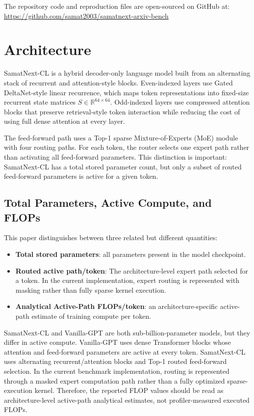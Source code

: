 \documentclass[11pt,a4paper]{article}
\begin{document}
The repository code and reproduction files are open-sourced on GitHub at: \\
\url{https://github.com/samat2003/samatnext-arxiv-bench}

\section{Architecture}
SamatNext-CL is a hybrid decoder-only language model built from an alternating stack of recurrent and attention-style blocks. Even-indexed layers use Gated DeltaNet-style linear recurrence, which maps token representations into fixed-size recurrent state matrices $S \in \mathbb{R}^{64 \times 64}$. Odd-indexed layers use compressed attention blocks that preserve retrieval-style token interaction while reducing the cost of using full dense attention at every layer.

The feed-forward path uses a Top-1 sparse Mixture-of-Experts (MoE) module with four routing paths. For each token, the router selects one expert path rather than activating all feed-forward parameters. This distinction is important: SamatNext-CL has a total stored parameter count, but only a subset of routed feed-forward parameters is active for a given token.

\subsection{Total Parameters, Active Compute, and FLOPs}
This paper distinguishes between three related but different quantities:

\begin{itemize}
\item \textbf{Total stored parameters}: all parameters present in the model checkpoint.
\item \textbf{Routed active path/token}: The architecture-level expert path selected for a token. In the current implementation, expert routing is represented with masking rather than fully sparse kernel execution.
\item \textbf{Analytical Active-Path FLOPs/token}: an architecture-specific active-path estimate of training compute per token.
\end{itemize}

SamatNext-CL and Vanilla-GPT are both sub-billion-parameter models, but they differ in active compute. Vanilla-GPT uses dense Transformer blocks whose attention and feed-forward parameters are active at every token. SamatNext-CL uses alternating recurrent/attention blocks and Top-1 routed feed-forward selection. In the current benchmark implementation, routing is represented through a masked expert computation path rather than a fully optimized sparse-execution kernel. Therefore, the reported FLOP values should be read as architecture-level active-path analytical estimates, not profiler-measured executed FLOPs.
\end{document}
